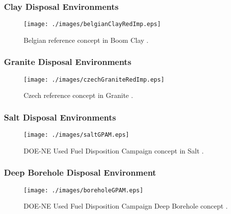 

\begin{frame}[c]
  \frametitle{Clay Disposal Environments}

  \begin{figure}[h!]
    \begin{center}
      \texttt{[image: ./images/belgianClayRedImp.eps]}
    \end{center}
    \caption{Belgian reference concept in Boom Clay 
    \cite{von_lensa_red-impact_2008}.}
    \label{fig:belgianClayRedImp}
  \end{figure}

\end{frame}

\begin{frame}[c]
  \frametitle{Granite Disposal Environments}

  \begin{figure}[h!]
    \begin{center}
      \texttt{[image: ./images/czechGraniteRedImp.eps]}
    \end{center}
    \caption{Czech reference concept in Granite 
    \cite{von_lensa_red-impact_2008}.}
    \label{fig:czechGraniteRedImp}
  \end{figure}

\end{frame}

\begin{frame}[c]
  \frametitle{Salt Disposal Environments}

  \begin{figure}[h!]
    \begin{center}
      \texttt{[image: ./images/saltGPAM.eps]}
    \end{center}
    \caption{DOE-NE Used Fuel Disposition Campaign  concept in 
    Salt \cite{clayton_generic_2011}.}
    \label{fig:saltGPAM}
  \end{figure}

\end{frame}

\begin{frame}[c]
  \frametitle{Deep Borehole Disposal Environment}

  \begin{figure}[h!]
    \begin{center}
      \texttt{[image: ./images/boreholeGPAM.eps]}
    \end{center}
    \caption{DOE-NE Used Fuel Disposition Campaign Deep Borehole concept 
    \cite{clayton_generic_2011}.}
    \label{fig:boreholeGPAM}
  \end{figure}

\end{frame}


